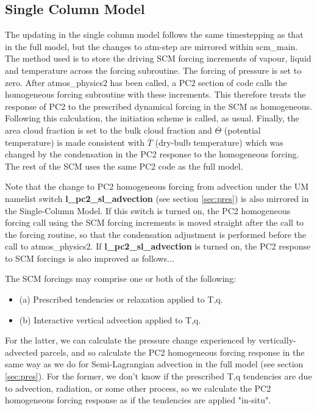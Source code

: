 \documentclass{UMDP_article}
\begin{document}
\subsection{Single Column Model}

The updating in the single column model follows the same timestepping as
that in the full model, but the changes to atm-step are mirrored
within scm\_main. The method used is to store the driving SCM forcing
increments of vapour, liquid and temperature across the forcing subroutine.
The forcing of pressure is
set to zero. After atmos\_physics2 has been called,
a PC2 section of code calls the
homogeneous forcing subroutine with these increments. This therefore
treats the response of PC2 to the prescribed dynamical forcing in the
SCM as homogeneous. Following
this calculation, the initiation scheme is called, as usual. Finally, the area
cloud fraction is set to the bulk cloud fraction and $\overline{\Theta}$
(potential temperature)
is made consistent with $\overline{T}$ (dry-bulb temperature) which was
changed by the condensation in the PC2 response to the homogeneous forcing.
The rest of the SCM uses the same PC2 code as the full model.

Note that the change to PC2 homogeneous forcing from advection under the UM
namelist switch \textbf{l\_pc2\_sl\_advection} (see section \ref{sec:pres})
is also mirrored in the Single-Column Model.  If this switch is turned on,
the PC2 homogeneous forcing call using the SCM forcing increments is moved
straight after the call to the forcing routine, so that the condensation
adjustment is performed before the call to atmos\_physics2.
If \textbf{l\_pc2\_sl\_advection} is turned on, the PC2 response to SCM
forcings is also improved as follows...

The SCM forcings may comprise one or both of the following:
\begin{itemize}
\item (a) Prescribed tendencies or relaxation applied to T,q.
\item (b) Interactive vertical advection applied to T,q.
\end{itemize}
For the latter, we can calculate the pressure change experienced by
vertically-advected parcels, and so calculate the PC2 homogeneous forcing
response in the same way as we do for Semi-Lagrangian advection in the
full model (see section \ref{sec:pres}).
For the former, we don't know if the prescribed T,q tendencies are due to
advection, radiation, or some other process, so we calculate the PC2
homogeneous forcing response as if the tendencies are applied "in-situ".
\end{document}
